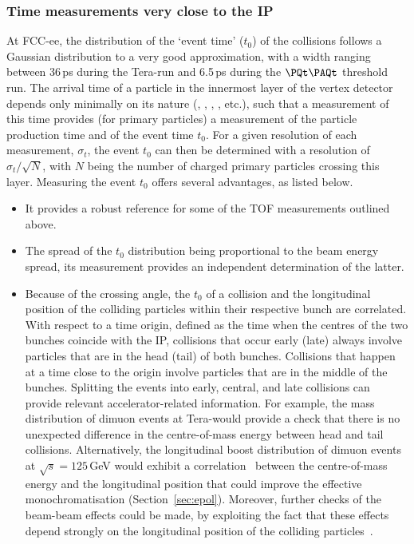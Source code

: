 \subsubsection{Time measurements very close to the IP}

At FCC-ee, the distribution of the `event time' ($t_0$) of the collisions follows a Gaussian distribution to a very good approximation, 
with a width ranging between 36\,ps during the Tera-\PZ run and 6.5\,ps during the $\ttbar$ threshold run.
The arrival time of a particle in the innermost layer of the vertex detector depends only minimally on its nature (\PK, \PGp, \PGm, \Pe, etc.), 
such that a measurement of this time provides (for primary particles) a measurement of the particle production time and of the event time $t_0$. 
For a given resolution of each measurement, $\sigma_t$, the event $t_0$ can then be determined with a resolution of $\sigma_t / \sqrt{N}$, 
with $N$ being the number of charged primary particles crossing this layer. 
Measuring the event $t_0$ offers several advantages, as listed below.

\begin{itemize}

\item It provides a robust reference for some of the TOF measurements outlined above. 

\item The spread of the $t_0$ distribution being proportional to the beam energy spread, its measurement provides an independent determination of the latter.

\item Because of the crossing angle, the $t_0$ of a collision and the longitudinal position of the colliding particles within their respective bunch are correlated. 
With respect to a time origin, defined as the time when the centres of the two bunches coincide with the IP, collisions that occur early (late) always involve particles that are in the head (tail) of both bunches. 
Collisions that happen at a time close to the origin involve particles that are in the middle of the bunches. 
Splitting the events into early, central, and late collisions can provide relevant accelerator-related information. 
For example, the mass distribution of dimuon events at Tera-\PZ would provide a check that there is no unexpected difference in the centre-of-mass energy between head and tail collisions. 
Alternatively, the longitudinal boost distribution of dimuon events at $\sqrt{s} = 125$\,GeV would exhibit a correlation~\cite{JanotEPOLtalk} 
between the centre-of-mass energy and the longitudinal position that could improve the effective monochromatisation (Section~\ref{sec:epol}). 
Moreover, further checks of the beam-beam effects could be made, 
by exploiting the fact that these effects depend strongly on the longitudinal position of the colliding particles~\cite{myTalkatKrakow}.

\end{itemize}

